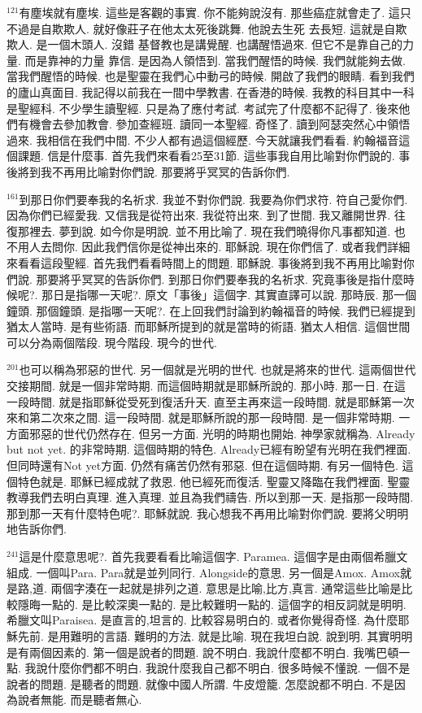\documentclass{book}
\begin{document}
$^{121}$有塵埃就有塵埃.
這些是客觀的事實.
你不能夠說沒有.
那些癌症就會走了.
這只不過是自欺欺人.
就好像莊子在他太太死後跳舞.
他說去生死 去長短.
這就是自欺欺人.
是一個木頭人.
沒錯 基督教也是講覺醒.
也講醒悟過來.
但它不是靠自己的力量.
而是靠神的力量 靠信.
是因為人領悟到.
當我們醒悟的時候.
我們就能夠去做.
當我們醒悟的時候.
也是聖靈在我們心中動弓的時候.
開啟了我們的眼睛.
看到我們的廬山真面目.
我記得以前我在一間中學教書.
在香港的時候.
我教的科目其中一科是聖經科.
不少學生讀聖經.
只是為了應付考試.
考試完了什麼都不記得了.
後來他們有機會去參加教會.
參加查經班.
讀同一本聖經.
奇怪了.
讀到阿瑟突然心中領悟過來.
我相信在我們中間.
不少人都有過這個經歷.
今天就讓我們看看.
約翰福音這個課題.
信是什麼事.
首先我們來看看25至31節.
這些事我自用比喻對你們說的.
事後將到我不再用比喻對你們說.
那要將乎冥冥的告訴你們.

$^{161}$到那日你們要奉我的名祈求.
我並不對你們說.
我要為你們求符.
符自己愛你們.
因為你們已經愛我.
又信我是從符出來.
我從符出來.
到了世間.
我又離開世界.
往復那裡去.
夢到說.
如今你是明說.
並不用比喻了.
現在我們曉得你凡事都知道.
也不用人去問你.
因此我們信你是從神出來的.
耶穌說.
現在你們信了.
或者我們詳細來看看這段聖經.
首先我們看看時間上的問題.
耶穌說.
事後將到我不再用比喻對你們說.
那要將乎冥冥的告訴你們.
到那日你們要奉我的名祈求.
究竟事後是指什麼時候呢?.
那日是指哪一天呢?.
原文「事後」這個字.
其實直譯可以說.
那時辰.
那一個鐘頭.
那個鐘頭.
是指哪一天呢?.
在上回我們討論到約翰福音的時候.
我們已經提到猶太人當時.
是有些術語.
而耶穌所提到的就是當時的術語.
猶太人相信.
這個世間可以分為兩個階段.
現今階段.
現今的世代.

$^{201}$也可以稱為邪惡的世代.
另一個就是光明的世代.
也就是將來的世代.
這兩個世代交接期間.
就是一個非常時期.
而這個時期就是耶穌所說的.
那小時.
那一日.
在這一段時間.
就是指耶穌從受死到復活升天.
直至主再來這一段時間.
就是耶穌第一次來和第二次來之間.
這一段時間.
就是耶穌所說的那一段時間.
是一個非常時期.
一方面邪惡的世代仍然存在.
但另一方面.
光明的時期也開始.
神學家就稱為.
Already but not yet.
的非常時期.
這個時期的特色.
Already已經有盼望有光明在我們裡面.
但同時還有Not yet方面.
仍然有痛苦仍然有邪惡.
但在這個時期.
有另一個特色.
這個特色就是.
耶穌已經成就了救恩.
他已經死而復活.
聖靈又降臨在我們裡面.
聖靈教導我們去明白真理.
進入真理.
並且為我們禱告.
所以到那一天.
是指那一段時間.
那到那一天有什麼特色呢?.
耶穌就說.
我心想我不再用比喻對你們說.
要將父明明地告訴你們.

$^{241}$這是什麼意思呢?.
首先我要看看比喻這個字.
Paramea.
這個字是由兩個希臘文組成.
一個叫Para.
Para就是並列同行.
Alongside的意思.
另一個是Amox.
Amox就是路,道.
兩個字湊在一起就是排列之道.
意思是比喻,比方,真言.
通常這些比喻是比較隱晦一點的.
是比較深奧一點的.
是比較難明一點的.
這個字的相反詞就是明明.
希臘文叫Paraisea.
是直言的,坦言的.
比較容易明白的.
或者你覺得奇怪.
為什麼耶穌先前.
是用難明的言語.
難明的方法.
就是比喻.
現在我坦白說.
說到明.
其實明明是有兩個因素的.
第一個是說者的問題.
說不明白.
我說什麼都不明白.
我嘴巴頓一點.
我說什麼你們都不明白.
我說什麼我自己都不明白.
很多時候不懂說.
一個不是說者的問題.
是聽者的問題.
就像中國人所謂.
牛皮燈籠.
怎麼說都不明白.
不是因為說者無能.
而是聽者無心.
\end{document}
